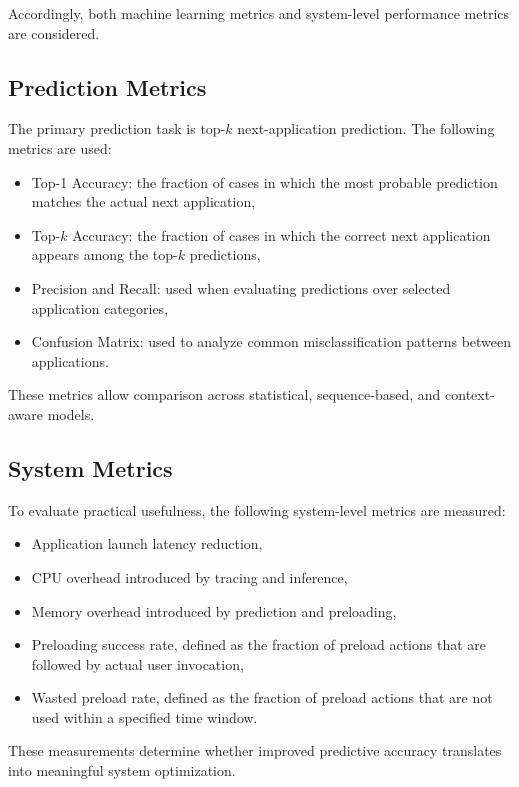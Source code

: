 \documentclass[11pt]{article}
\begin{document}
Accordingly, both machine learning metrics and system-level performance metrics are considered.

\subsection{Prediction Metrics}

The primary prediction task is top-$k$ next-application prediction. The following metrics are used:

\begin{itemize}
\item Top-1 Accuracy: the fraction of cases in which the most probable prediction matches the actual next application,
\item Top-$k$ Accuracy: the fraction of cases in which the correct next application appears among the top-$k$ predictions,
\item Precision and Recall: used when evaluating predictions over selected application categories,
\item Confusion Matrix: used to analyze common misclassification patterns between applications.
\end{itemize}

These metrics allow comparison across statistical, sequence-based, and context-aware models.

\subsection{System Metrics}

To evaluate practical usefulness, the following system-level metrics are measured:

\begin{itemize}
\item Application launch latency reduction,
\item CPU overhead introduced by tracing and inference,
\item Memory overhead introduced by prediction and preloading,
\item Preloading success rate, defined as the fraction of preload actions that are followed by actual user invocation,
\item Wasted preload rate, defined as the fraction of preload actions that are not used within a specified time window.
\end{itemize}

These measurements determine whether improved predictive accuracy translates into meaningful system optimization.
\end{document}
